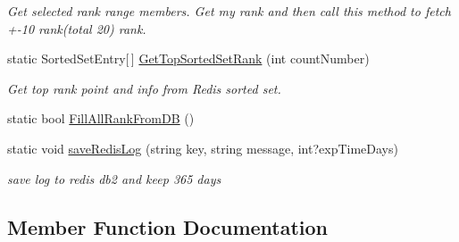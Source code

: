 \begin{DoxyCompactItemize}
\begin{DoxyCompactList}\small\item\em Get selected rank range members. Get my rank and then call this method to fetch +-\/10 rank(total 20) rank. \end{DoxyCompactList}\item 
static Sorted\+Set\+Entry\mbox{[}$\,$\mbox{]} \hyperlink{a00030_a66d68dc112b34f47141bfcac4bf743ea}{Get\+Top\+Sorted\+Set\+Rank} (int count\+Number)\hypertarget{a00030_a66d68dc112b34f47141bfcac4bf743ea}{}\label{a00030_a66d68dc112b34f47141bfcac4bf743ea}

\begin{DoxyCompactList}\small\item\em Get top rank point and info from Redis sorted set. \end{DoxyCompactList}\item 
static bool \hyperlink{a00030_a8227a017bb2cf72e82c0540aec88f66f}{Fill\+All\+Rank\+From\+DB} ()
\item 
static void \hyperlink{a00030_a5b410be6b427222ca5991bf1ed66d3c4}{save\+Redis\+Log} (string key, string message, int?exp\+Time\+Days)\hypertarget{a00030_a5b410be6b427222ca5991bf1ed66d3c4}{}\label{a00030_a5b410be6b427222ca5991bf1ed66d3c4}

\begin{DoxyCompactList}\small\item\em save log to redis db2 and keep 365 days \end{DoxyCompactList}\end{DoxyCompactItemize}


\subsection{Member Function Documentation}

